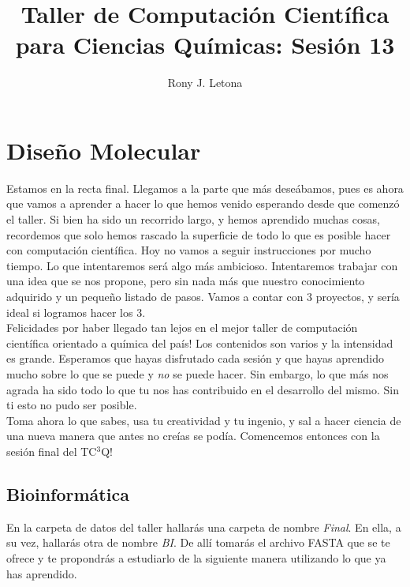 \documentclass[10pt,letterpaper]{article}
\author{Rony J. Letona}
\title{Taller de Computaci\'on Cient\'ifica para Ciencias Qu\'imicas: Sesi\'on 13}
\begin{document}
\maketitle

\section{Dise\~no Molecular}
Estamos en la recta final. Llegamos a la parte que m\'as dese\'abamos, pues es ahora que vamos a aprender a hacer lo que hemos venido esperando desde que comenz\'o el taller. Si bien ha sido un recorrido largo, y hemos aprendido muchas cosas, recordemos que solo hemos rascado la superficie de todo lo que es posible hacer con computaci\'on cient\'ifica. Hoy no vamos a seguir instrucciones por mucho tiempo. Lo que intentaremos ser\'a algo m\'as ambicioso. Intentaremos trabajar con una idea que se nos propone, pero sin nada m\'as que nuestro conocimiento adquirido y un peque\~no listado de pasos. Vamos a contar con 3 proyectos, y ser\'ia ideal si logramos hacer los 3.\\

Felicidades por haber llegado tan lejos en el mejor taller de computaci\'on cient\'ifica orientado a qu\'imica del pa\'is! Los contenidos son varios y la intensidad es grande. Esperamos que hayas disfrutado cada sesi\'on y que hayas aprendido mucho sobre lo que se puede y \emph{no} se puede hacer. Sin embargo, lo que m\'as nos agrada ha sido todo lo que tu nos has contribuido en el desarrollo del mismo. Sin ti esto no pudo ser posible.\\

Toma ahora lo que sabes, usa tu creatividad y tu ingenio, y sal a hacer ciencia de una nueva manera que antes no cre\'ias se pod\'ia. Comencemos entonces con la sesi\'on final del TC$^3$Q!

\subsection{Bioinform\'atica}
En la carpeta de datos del taller hallar\'as una carpeta de nombre \textit{Final}. En ella, a su vez, hallar\'as otra de nombre \textit{BI}. De all\'i tomar\'as el archivo FASTA que se te ofrece y te propondr\'as a estudiarlo de la siguiente manera utilizando lo que ya has aprendido.\\
\end{document}
